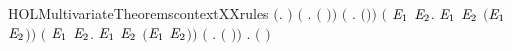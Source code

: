\begin{SaveVerbatim}{HOLMultivariateTheoremscontextXXrules}
\HOLTokenTurnstile{} \ensuremath{(}\HOLSymConst{\HOLTokenForall{}}.   \ensuremath{)} \HOLSymConst{\HOLTokenConj{}} \ensuremath{(}\HOLSymConst{\HOLTokenForall{}} .   \ensuremath{(} \ensuremath{)}\ensuremath{)} \HOLSymConst{\HOLTokenConj{}}
   \ensuremath{(}\HOLSymConst{\HOLTokenForall{}}  .    \HOLSymConst{\HOLTokenImp{}}   \ensuremath{(}\HOLSymConst{\ensuremath{\ldotp}}\ensuremath{)}\ensuremath{)} \HOLSymConst{\HOLTokenConj{}}
   \ensuremath{(}\HOLSymConst{\HOLTokenForall{}} \ensuremath{\HOLBoundVar{E}\sb{\mathrm{1}}} \ensuremath{\HOLBoundVar{E}\sb{\mathrm{2}}}.
          \ensuremath{\HOLBoundVar{E}\sb{\mathrm{1}}} \HOLSymConst{\HOLTokenConj{}}   \ensuremath{\HOLBoundVar{E}\sb{\mathrm{2}}} \HOLSymConst{\HOLTokenImp{}}   \ensuremath{(}\ensuremath{\HOLBoundVar{E}\sb{\mathrm{1}}} \HOLSymConst{\ensuremath{+}} \ensuremath{\HOLBoundVar{E}\sb{\mathrm{2}}}\ensuremath{)}\ensuremath{)} \HOLSymConst{\HOLTokenConj{}}
   \ensuremath{(}\HOLSymConst{\HOLTokenForall{}} \ensuremath{\HOLBoundVar{E}\sb{\mathrm{1}}} \ensuremath{\HOLBoundVar{E}\sb{\mathrm{2}}}.
          \ensuremath{\HOLBoundVar{E}\sb{\mathrm{1}}} \HOLSymConst{\HOLTokenConj{}}   \ensuremath{\HOLBoundVar{E}\sb{\mathrm{2}}} \HOLSymConst{\HOLTokenImp{}}   \ensuremath{(}\ensuremath{\HOLBoundVar{E}\sb{\mathrm{1}}} \HOLSymConst{\ensuremath{\mid}} \ensuremath{\HOLBoundVar{E}\sb{\mathrm{2}}}\ensuremath{)}\ensuremath{)} \HOLSymConst{\HOLTokenConj{}}
   \ensuremath{(}\HOLSymConst{\HOLTokenForall{}}  .    \HOLSymConst{\HOLTokenImp{}}   \ensuremath{(}  \ensuremath{)}\ensuremath{)} \HOLSymConst{\HOLTokenConj{}}
   \HOLSymConst{\HOLTokenForall{}}  .    \HOLSymConst{\HOLTokenImp{}}   \ensuremath{(}  \ensuremath{)}
\end{SaveVerbatim}
